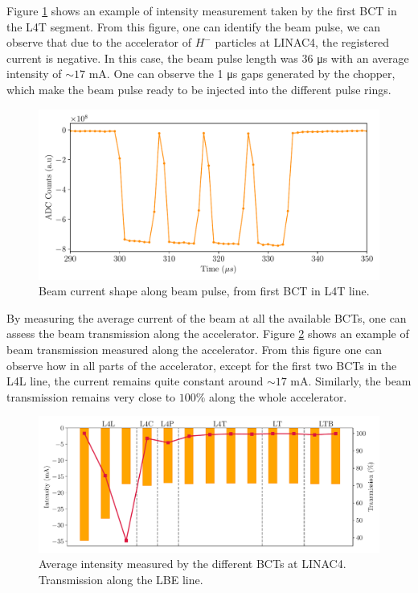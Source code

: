 Figure \ref{fig:BCTwithTime} shows an example of intensity measurement taken by the first BCT in the L4T segment. From this figure, one can identify the beam pulse, we can observe that due to the accelerator of $H^{-}$ particles at LINAC4, the registered current is negative. In this case, the beam pulse length was 36 \si[]{\micro \second} with an average intensity of $\sim 17 $ \si[]{\milli \ampere}. One can observe the 1 \si[]{\micro \second} gaps generated by the chopper, which make the beam pulse ready to be injected into the different pulse rings. 

\begin{figure}
    \centering
    \includegraphics[width=0.7\columnwidth]{IntensityVStime/IntensityVStime.pdf}
    \caption[The LOF caption]{Beam current shape along beam pulse, from first BCT in L4T line.}
    \label{fig:BCTwithTime}
\end{figure}

By measuring the average current of the beam at all the available BCTs, one can assess the beam transmission along the accelerator. Figure \ref{fig:BeamTrans} shows an example of beam transmission measured along the accelerator. From this figure one can observe how in all parts of the accelerator, except for the first two BCTs in the L4L line, the current remains quite constant around $\sim 17$ \si[]{\milli \ampere}.  Similarly, the beam transmission remains very close to $100 \%$ along the whole accelerator. 

\begin{figure}
    \centering
    \includegraphics[width=0.9\columnwidth]{BCT_Transmission/TransmissionBCT.pdf}
    \caption{Average intensity measured by the different BCTs at LINAC4. Transmission along the LBE line.}
    \label{fig:BeamTrans}
\end{figure}


